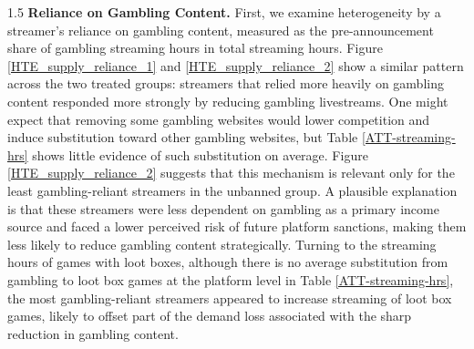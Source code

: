 \documentclass[a4paper,12pt]{article}
\begin{document}
\begin{spacing}{1.5}
\noindent \textbf{Reliance on Gambling Content.} First, we examine heterogeneity by a streamer’s reliance on gambling content, measured as the pre-announcement share of gambling streaming hours in total streaming hours. Figure \ref{HTE_supply_reliance_1} and \ref{HTE_supply_reliance_2} show a similar pattern across the two treated groups: streamers that relied more heavily on gambling content responded more strongly by reducing gambling livestreams. One might expect that removing some gambling websites would lower competition and induce substitution toward other gambling websites, but Table \ref{ATT-streaming-hrs} shows little evidence of such substitution on average. Figure \ref{HTE_supply_reliance_2} suggests that this mechanism is relevant only for the least gambling-reliant streamers in the unbanned group. A plausible explanation is that these streamers were less dependent on gambling as a primary income source and faced a lower perceived risk of future platform sanctions, making them less likely to reduce gambling content strategically. Turning to the streaming hours of games with loot boxes, although there is no average substitution from gambling to loot box games at the platform level in Table \ref{ATT-streaming-hrs}, the most gambling-reliant streamers appeared to increase streaming of loot box games, likely to offset part of the demand loss associated with the sharp reduction in gambling content.



\end{spacing}
\end{document}
